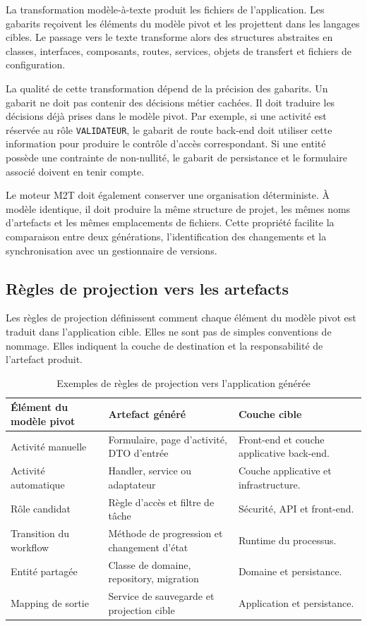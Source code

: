 La transformation modèle-à-texte produit les fichiers de l'application. Les gabarits reçoivent les éléments du modèle pivot et les projettent dans les langages cibles. Le passage vers le texte transforme alors des structures abstraites en classes, interfaces, composants, routes, services, objets de transfert et fichiers de configuration.

La qualité de cette transformation dépend de la précision des gabarits. Un gabarit ne doit pas contenir des décisions métier cachées. Il doit traduire les décisions déjà prises dans le modèle pivot. Par exemple, si une activité est réservée au rôle \texttt{VALIDATEUR}, le gabarit de route back-end doit utiliser cette information pour produire le contrôle d'accès correspondant. Si une entité possède une contrainte de non-nullité, le gabarit de persistance et le formulaire associé doivent en tenir compte.

Le moteur M2T doit également conserver une organisation déterministe. À modèle identique, il doit produire la même structure de projet, les mêmes noms d'artefacts et les mêmes emplacements de fichiers. Cette propriété facilite la comparaison entre deux générations, l'identification des changements et la synchronisation avec un gestionnaire de versions.

\subsection{Règles de projection vers les artefacts}

Les règles de projection définissent comment chaque élément du modèle pivot est traduit dans l'application cible. Elles ne sont pas de simples conventions de nommage. Elles indiquent la couche de destination et la responsabilité de l'artefact produit.

\begin{table}[H]
\centering
\small
\caption{Exemples de règles de projection vers l'application générée}
\label{tab:chap3-projection-m2t}
\begin{tabular}{p{3.8cm}p{4.8cm}p{5.2cm}}
\hline
\textbf{Élément du modèle pivot} & \textbf{Artefact généré} & \textbf{Couche cible} \\
\hline
Activité manuelle & Formulaire, page d'activité, DTO d'entrée & Front-end et couche applicative back-end. \\
Activité automatique & Handler, service ou adaptateur & Couche applicative et infrastructure. \\
Rôle candidat & Règle d'accès et filtre de tâche & Sécurité, API et front-end. \\
Transition du workflow & Méthode de progression et changement d'état & Runtime du processus. \\
Entité partagée & Classe de domaine, repository, migration & Domaine et persistance. \\
Mapping de sortie & Service de sauvegarde et projection cible & Application et persistance. \\
\hline
\end{tabular}
\end{table}

